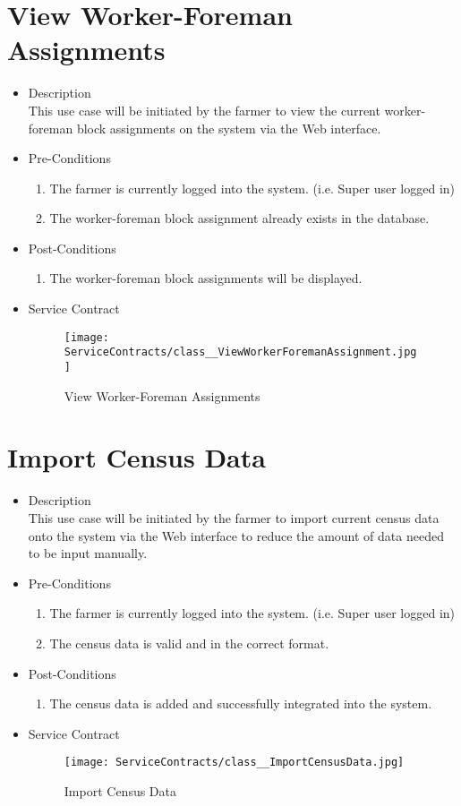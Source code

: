 \documentclass[11pt,fleqn]{book} %
\begin{document}
\section{View Worker-Foreman Assignments}
\begin{itemize}
	\item Description\\
	This use case will be initiated by the farmer to view the current worker-foreman block assignments on the system via the Web interface.
	\item Pre-Conditions
	\begin{enumerate}
		\item The farmer is currently logged into the system. (i.e. Super user logged in)
		\item The worker-foreman block assignment already exists in the database.		
	\end{enumerate}
	\item Post-Conditions
	\begin{enumerate}
		\item The worker-foreman block assignments will be displayed.
	\end{enumerate}
	\item Service Contract
	\begin{figure}
		\texttt{[image: ServiceContracts/class\_\_ViewWorkerForemanAssignment.jpg]}
		\caption{View Worker-Foreman Assignments}
	\end{figure}
\end{itemize}

\section{Import Census Data}
\begin{itemize}
	\item Description\\
	This use case will be initiated by the farmer to import current census data onto the system via the Web interface to reduce the amount of data needed to be input manually.
	\item Pre-Conditions
	\begin{enumerate}
		\item The farmer is currently logged into the system. (i.e. Super user logged in)
		\item The census data is valid and in the correct format.								
	\end{enumerate}
	\item Post-Conditions
	\begin{enumerate}
		\item The census data is added and successfully integrated into the system.
	\end{enumerate}
	\item Service Contract
	\begin{figure}
		\texttt{[image: ServiceContracts/class\_\_ImportCensusData.jpg]}
		\caption{Import Census Data}
	\end{figure}
\end{itemize}
\end{document}
